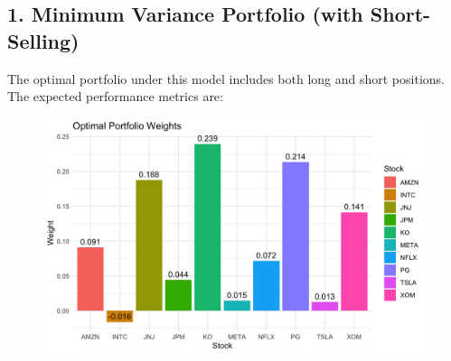 \documentclass[11pt]{article}
\begin{document}
\subsection*{1. Minimum Variance Portfolio (with Short-Selling)}
The optimal portfolio under this model includes both long and short positions. The expected performance metrics are:
\begin{figure}[H]
    \centering
    \begin{minipage}{0.48\textwidth}
        \includegraphics[width=\linewidth]{Findings_Yutong/weights.png}
    \end{minipage}%
    \hfill
    \begin{minipage}{0.48\textwidth}
        \label{opt-weights-with}
    \end{minipage}
\end{figure}
\end{document}
